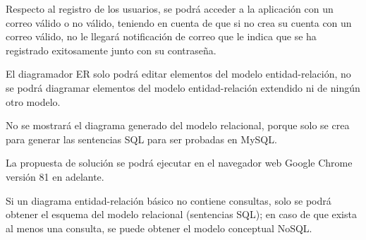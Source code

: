 Respecto al registro de los usuarios, se podrá acceder a la aplicación con un correo válido o no válido, teniendo en cuenta de que si no crea su cuenta con un correo válido, no le llegará notificación de correo que le indica que se ha registrado exitosamente junto con su contraseña.


El diagramador ER solo podrá editar elementos del modelo entidad-relación, no se podrá diagramar elementos del modelo entidad-relación extendido ni de ningún otro modelo.


No se mostrará el diagrama generado del modelo relacional, porque solo se crea para generar las sentencias SQL para ser probadas en MySQL.


La propuesta de solución se podrá ejecutar en el navegador web Google Chrome versión 81 en adelante.


Si un diagrama entidad-relación básico no contiene consultas, solo se podrá obtener el esquema del modelo relacional (sentencias SQL); en caso de que exista al menos una consulta, se puede obtener el modelo conceptual NoSQL.
    